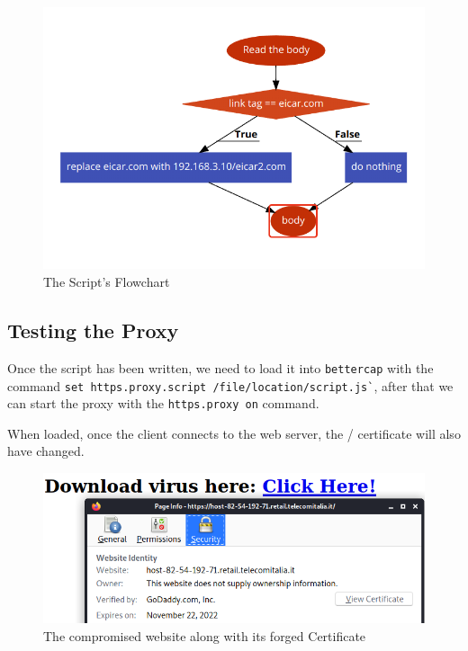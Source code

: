 \begin{figure}[h!]
 \centering
 \includegraphics[width=13cm]{img/script_flowchart.png}
 \caption{The Script's Flowchart}
 \label{fig: flowchart}
\end{figure}

\newpage

\subsection{Testing the Proxy}

Once the script has been written, we need to load it into \verb|bettercap| with the command \verb|set https.proxy.script /file/location/script.js`|, after that we can start the proxy with the \verb|https.proxy on| command.

When loaded, once the client connects to the web server, the / certificate will also have changed.

\begin{figure}[h!]
 \centering
 \includegraphics[width=13cm]{img/spoofed_certificate.png}
 \caption{The compromised website along with its forged Certificate}
 \label{fig: spoofed-certificate}
\end{figure}

